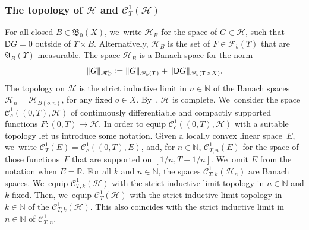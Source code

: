 \documentclass[JEP,XML,SOM,Unicode,published]{cedram}
\theoremstyle{definition}
\theoremstyle{remark}
\DeclarePairedDelimiter{\norm}{\lVert}{\rVert}
\begin{document}
\subsubsection{The topology of \texorpdfstring{$\mathscr{H}$}{H} and \texorpdfstring{$\mathscr{C}^{1}_{T}(\mathscr{H})$}{H-valued continuously differentiable functions}}
For all closed $B \in \mathfrak{B}_{0}(X)$, we~write $\mathscr{H}_{B}$ for the space of $G \in \mathscr{H}$, such that $\mathsf{D} G = 0$ outside of $\varUpsilon \times B$.
Alternatively, $\mathscr{H}_{B}$ is the set of $F \in \mathscr{F}_{b}(\varUpsilon)$ that are $\mathfrak{A}_{B}(\varUpsilon)$-measurable.
The space $\mathscr{H}_{B}$ is a Banach space for the norm
\begin{equation*}
\norm{G}_{\mathscr{H}_{B}} \coloneq \norm{G}_{\mathscr{F}_{b}(\varUpsilon)} + \norm{\mathsf{D} G}_{\mathscr{F}_{b}(\varUpsilon \times X)}.
\end{equation*}
The topology on $\mathscr{H}$ is the strict inductive limit in $n \in \mathbb{N}$ of the Banach spaces $\mathscr{H}_{n} = \mathscr{H}_{B(o,n)}$, for any fixed $o \in X$.
By~\cite[Prop.\,9(iii), p.\,II.34]{BourbakiEVT}, $\mathscr{H}$ is complete. We~consider the space $\mathscr{C}_{c}^{1}((0,T), \mathscr{H})$ of continuously differentiable and compactly supported functions $F \colon (0,T) \to \mathscr{H}$.
In order to equip $\mathscr{C}_{c}^{1}((0,T), \mathscr{H})$ with a suitable topology let us introduce some notation.
Given a locally convex linear space~$E$, we~write $\mathscr{C}^{1}_{T}(E) = \mathscr{C}_{c}^{1}((0,T), E)$, and, for $n \in \mathbb{N}$, $\mathscr{C}^{1}_{T,n}(E)$ for the space of those functions~$F$ that are supported on $[1/n, T-1/n]$. We~omit $E$ from the notation when $E = \mathbb{R}$.
For all $k$ and $n \in \mathbb{N}$, the spaces $\mathscr{C}^{1}_{T,k}(\mathscr{H}_{n})$ are Banach spaces. We~equip $\mathscr{C}^{1}_{T,k}(\mathscr{H})$ with the strict inductive-limit topology in $n \in \mathbb{N}$ and $k$ fixed.
Then, we~equip $\mathscr{C}^{1}_{T}(\mathscr{H})$ with the strict inductive-limit topology in $k \in \mathbb{N}$ of the $\mathscr{C}^{1}_{T,k}(\mathscr{H})$.
This also coincides with the strict inductive limit in $n \in \mathbb{N}$ of $\mathscr{C}^{1}_{T,n}$.
\end{document}
